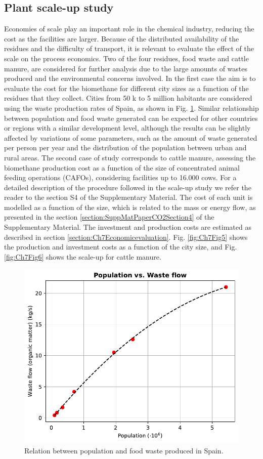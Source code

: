 \begin{refsection}[referencesCh7]
\subsection{Plant scale-up study}
Economies of scale play an important role in the chemical industry, reducing the cost as the facilities are larger. Because of the distributed availability of the residues and the difficulty of transport, it is relevant to evaluate the effect of the scale on the process economics. Two of the four residues, food waste and cattle manure, are considered for further analysis due to the large amounts of wastes produced and the environmental concerns involved. In the first case the aim is to evaluate the cost for the biomethane for different city sizes as a function of the residues that they collect. Cities from 50 k to 5 million habitants are considered using the waste production rates of Spain, as shown in Fig. \ref{fig:Ch7Fig4}. Similar relationship between population and food waste generated can be expected for other countries or regions with a similar development level, although the results can be slightly affected by variations of some parameters, such as the amount of waste generated per person per year and the distribution of the population between urban and rural areas. The second case of study corresponds to cattle manure, assessing the biomethane production cost as a function of the size of concentrated animal feeding operations (CAFOs), considering facilities up to 16.000 cows. For a detailed description of the procedure followed in the scale-up study we refer the reader to the section S4 of the Supplementary Material. The cost of each unit is modelled as a function of the size, which is related to the mass or energy flow, as presented in the section \ref{section:SuppMatPaperCO2Section4} of the Supplementary Material. The investment and production costs are estimated as described in section \ref{section:Ch7Economicevaluation}. Fig. \ref{fig:Ch7Fig5} shows the production and investment costs as a function of the city size, and Fig. \ref{fig:Ch7Fig6} shows the scale-up for cattle manure.

\begin{figure}[h]
	\centering
	\includegraphics[width=0.8\linewidth, trim={0cm 0cm 0cm 0cm},clip]{gfx/Chapter7/Figure4.pdf} 
	\caption{Relation between population and food waste produced in Spain.}
	\label{fig:Ch7Fig4}
\end{figure}


\end{refsection}

